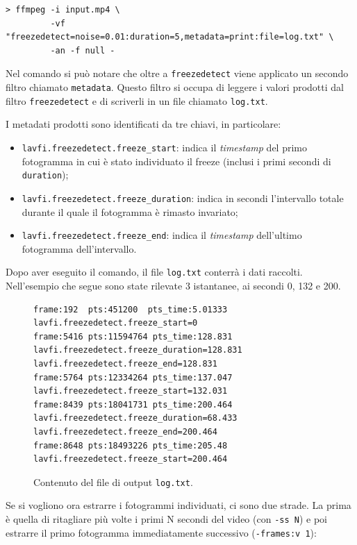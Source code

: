 \begin{verbatim}
> ffmpeg -i input.mp4 \
         -vf "freezedetect=noise=0.01:duration=5,metadata=print:file=log.txt" \
         -an -f null -
\end{verbatim}

Nel comando si può notare che oltre a \texttt{freezedetect} viene applicato un secondo filtro chiamato \texttt{metadata}. Questo filtro si occupa di leggere i valori prodotti dal filtro \texttt{freezedetect} e di scriverli in un file chiamato \texttt{log.txt}.

I metadati prodotti sono identificati da tre chiavi, in particolare:

\begin{itemize}
	\item \texttt{lavfi.freezedetect.freeze\_start}: indica il \emph{timestamp} del primo fotogramma in cui è stato individuato il freeze (inclusi i primi secondi di \texttt{duration});
	\item \texttt{lavfi.freezedetect.freeze\_duration}: indica in secondi l'intervallo totale durante il quale il fotogramma è rimasto invariato;
	\item \texttt{lavfi.freezedetect.freeze\_end}: indica il \emph{timestamp} dell'ultimo fotogramma dell'intervallo.
\end{itemize}

Dopo aver eseguito il comando, il file \texttt{log.txt} conterrà i dati raccolti. Nell'esempio che segue sono state rilevate 3 istantanee, ai secondi 0, 132 e 200.

\begin{figure}[H]
\begin{verbatim}
frame:192  pts:451200  pts_time:5.01333
lavfi.freezedetect.freeze_start=0
frame:5416 pts:11594764 pts_time:128.831
lavfi.freezedetect.freeze_duration=128.831
lavfi.freezedetect.freeze_end=128.831
frame:5764 pts:12334264 pts_time:137.047
lavfi.freezedetect.freeze_start=132.031
frame:8439 pts:18041731 pts_time:200.464
lavfi.freezedetect.freeze_duration=68.433
lavfi.freezedetect.freeze_end=200.464
frame:8648 pts:18493226 pts_time:205.48
lavfi.freezedetect.freeze_start=200.464
\end{verbatim}
\caption{Contenuto del file di output \texttt{log.txt}.}
\label{fig:diff_freezeout}
\end{figure}

Se si vogliono ora estrarre i fotogrammi individuati, ci sono due strade. La prima è quella di ritagliare più volte i primi N secondi del video (con \texttt{-ss N}) e poi estrarre il primo fotogramma immediatamente successivo (\texttt{-frames:v 1}):

